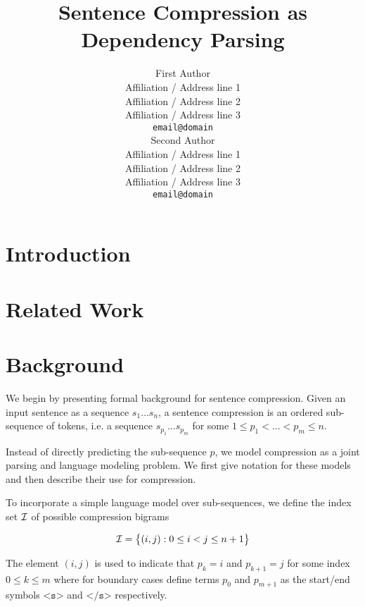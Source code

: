 \documentclass[11pt]{article}
\title{Sentence Compression as Dependency Parsing}
\author{First Author \\
  Affiliation / Address line 1 \\
  Affiliation / Address line 2 \\
  Affiliation / Address line 3 \\
  {\tt email@domain} \\\And
  Second Author \\
  Affiliation / Address line 1 \\
  Affiliation / Address line 2 \\
  Affiliation / Address line 3 \\
  {\tt email@domain} \\}
\date{}
\newcommand{\Set}[1]{\big\{ #1 \big\}}
\newcommand{\IndexSet}{{\cal I}}
\begin{document}
\maketitle
\begin{abstract}
\end{abstract}

\section{Introduction}

\section{Related Work}


\cite{eisner99dp}

\cite{huang2005machine}

\section{Background}
We begin by presenting formal background for sentence compression. Given an input sentence as a sequence $s_1 \ldots s_n$, a sentence compression is an ordered sub-sequence of tokens, i.e. a sequence $s_{p_1} \ldots s_{p_m}$ for some
$1 \leq p_1 < \ldots < p_m \leq n$. 

Instead of directly predicting the sub-sequence $p$, we model compression as a joint parsing and language modeling problem. We first give notation for these models and then describe their use for compression.




To incorporate a simple language model over sub-sequences, we define the index set ${\cal I}$ of possible compression bigrams 

\[ \IndexSet = \Set{(i,j) : 0 \leq i < j \leq n+1} \]

\noindent The element $(i,j)$ is used to indicate that $p_k = i$ and $p_{k+1}
=j$ for some index $0 \leq k \leq m$ where for boundary cases define terms $p_0$ and $p_{m+1}$ as the start/end symbols $\texttt{<s>}$ and $\texttt{</s>}$ respectively.
\end{document}
